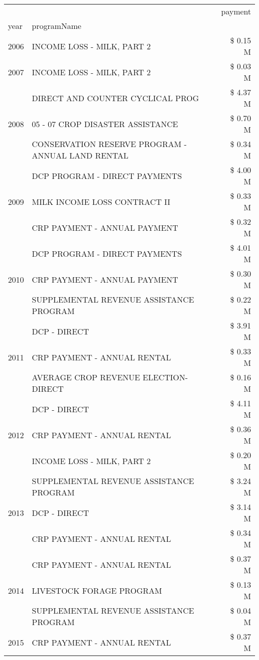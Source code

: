 \begin{tabular}{llr}
\toprule
 &  & payment \\
year & programName &  \\
\midrule
2006 & INCOME LOSS - MILK, PART 2 & \$ 0.15 M \\
\cline{1-3}
2007 & INCOME LOSS - MILK, PART 2 & \$ 0.03 M \\
\cline{1-3}
\multirow[t]{3}{*}{2008} & DIRECT AND COUNTER CYCLICAL PROG & \$ 4.37 M \\
 & 05 - 07 CROP DISASTER ASSISTANCE & \$ 0.70 M \\
 & CONSERVATION RESERVE PROGRAM - ANNUAL LAND RENTAL & \$ 0.34 M \\
\cline{1-3}
\multirow[t]{3}{*}{2009} & DCP PROGRAM - DIRECT PAYMENTS & \$ 4.00 M \\
 & MILK INCOME LOSS CONTRACT II & \$ 0.33 M \\
 & CRP PAYMENT - ANNUAL PAYMENT & \$ 0.32 M \\
\cline{1-3}
\multirow[t]{3}{*}{2010} & DCP PROGRAM - DIRECT PAYMENTS & \$ 4.01 M \\
 & CRP PAYMENT - ANNUAL PAYMENT & \$ 0.30 M \\
 & SUPPLEMENTAL REVENUE ASSISTANCE PROGRAM & \$ 0.22 M \\
\cline{1-3}
\multirow[t]{3}{*}{2011} & DCP - DIRECT & \$ 3.91 M \\
 & CRP PAYMENT - ANNUAL RENTAL & \$ 0.33 M \\
 & AVERAGE CROP REVENUE ELECTION-DIRECT & \$ 0.16 M \\
\cline{1-3}
\multirow[t]{3}{*}{2012} & DCP - DIRECT & \$ 4.11 M \\
 & CRP PAYMENT - ANNUAL RENTAL & \$ 0.36 M \\
 & INCOME LOSS - MILK, PART 2 & \$ 0.20 M \\
\cline{1-3}
\multirow[t]{3}{*}{2013} & SUPPLEMENTAL REVENUE ASSISTANCE PROGRAM & \$ 3.24 M \\
 & DCP - DIRECT & \$ 3.14 M \\
 & CRP PAYMENT - ANNUAL RENTAL & \$ 0.34 M \\
\cline{1-3}
\multirow[t]{3}{*}{2014} & CRP PAYMENT - ANNUAL RENTAL & \$ 0.37 M \\
 & LIVESTOCK FORAGE PROGRAM & \$ 0.13 M \\
 & SUPPLEMENTAL REVENUE ASSISTANCE PROGRAM & \$ 0.04 M \\
\cline{1-3}
\multirow[t]{3}{*}{2015} & CRP PAYMENT - ANNUAL RENTAL & \$ 0.37 M \\

\end{tabular}
